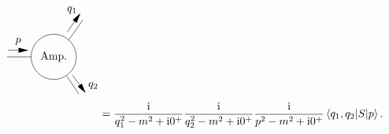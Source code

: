 \begin{equation}
\begin{aligned}
\begin{gathered}
\begin{tikzpicture}[x=0.75pt,y=0.75pt,yscale=-1,xscale=1]
            \draw   (224,171.35) .. controls (224,156.25) and (236.25,144) .. (251.35,144) .. controls (266.46,144) and (278.71,156.25) .. (278.71,171.35) .. controls (278.71,186.46) and (266.46,198.71) .. (251.35,198.71) .. controls (236.25,198.71) and (224,186.46) .. (224,171.35) -- cycle ;
            \draw    (194.71,171.35) -- (224,171.35) ;
            \draw    (269.29,151.35) -- (286.71,126.56) ;
            \draw    (267.29,194.56) -- (281.71,216.53) ;
            \draw    (195.94,163.35) -- (218.65,163.35) ;
            \draw [shift={(220.65,163.35)}, rotate = 180] [fill={rgb, 255:red, 0; green, 0; blue, 0 }  ][line width=0.08]  [draw opacity=0] (12,-3) -- (0,0) -- (12,3) -- cycle    ;
            \draw    (267.71,141.28) -- (282.55,120.19) ;
            \draw [shift={(283.71,118.56)}, rotate = 485.15] [fill={rgb, 255:red, 0; green, 0; blue, 0 }  ][line width=0.08]  [draw opacity=0] (12,-3) -- (0,0) -- (12,3) -- cycle    ;
            \draw    (274,193.46) -- (288.81,213.57) ;
            \draw [shift={(290,215.18)}, rotate = 233.63] [fill={rgb, 255:red, 0; green, 0; blue, 0 }  ][line width=0.08]  [draw opacity=0] (12,-3) -- (0,0) -- (12,3) -- cycle    ;
            
            \draw (251.35,171.35) node   [align=left] {Amp.};
            \draw (208.29,157.95) node [anchor=south] [inner sep=0.75pt]    {$p$};
            \draw (280.71,120.16) node [anchor=south east] [inner sep=0.75pt]    {$q_{1}$};
            \draw (292,211.78) node [anchor=south west] [inner sep=0.75pt]    {$q_{2}$};
            \end{tikzpicture}                     
    \end{gathered} \\
    &= \frac{\ii}{q_1^2 - m^2 + \ii 0^+} \frac{\ii}{q_2^2 - m^2 + \ii 0^+} \frac{\ii}{p^2 - m^2 + \ii 0^+} \mel{q_1, q_2}{S}{p} .
    \end{aligned}
\end{equation}
